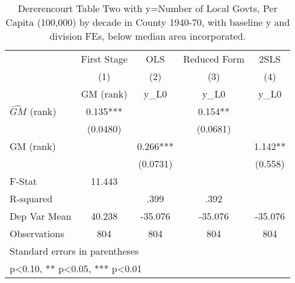 \begin{table}[htbp]\centering
\def\sym#1{\ifmmode^{#1}\else\(^{#1}\)\fi}
\caption{Dererencourt Table Two with y=Number of Local Govts, Per Capita (100,000) by decade in County 1940-70, with baseline y and division FEs, below median area incorporated.}
\begin{tabular}{l*{4}{c}}
\toprule
                    & First Stage   &         OLS   &Reduced Form   &        2SLS   \\
                    &\multicolumn{1}{c}{(1)}&\multicolumn{1}{c}{(2)}&\multicolumn{1}{c}{(3)}&\multicolumn{1}{c}{(4)}\\
                    &\multicolumn{1}{c}{GM  (rank)}&\multicolumn{1}{c}{y\_L0}&\multicolumn{1}{c}{y\_L0}&\multicolumn{1}{c}{y\_L0}\\
\midrule
$\hat{GM}$ (rank)   &       0.135***&               &       0.154** &               \\
                    &    (0.0480)   &               &    (0.0681)   &               \\
\addlinespace
GM  (rank)          &               &       0.266***&               &       1.142** \\
                    &               &    (0.0731)   &               &     (0.558)   \\
\midrule
F-Stat              &      11.443   &               &               &               \\
R-squared           &               &        .399   &        .392   &               \\
Dep Var Mean        &      40.238   &     -35.076   &     -35.076   &     -35.076   \\
Observations        &         804   &         804   &         804   &         804   \\
\bottomrule
\multicolumn{5}{l}{\footnotesize Standard errors in parentheses}\\
\multicolumn{5}{l}{\footnotesize * p<0.10, ** p<0.05, *** p<0.01}\\
\end{tabular}
\end{table}
